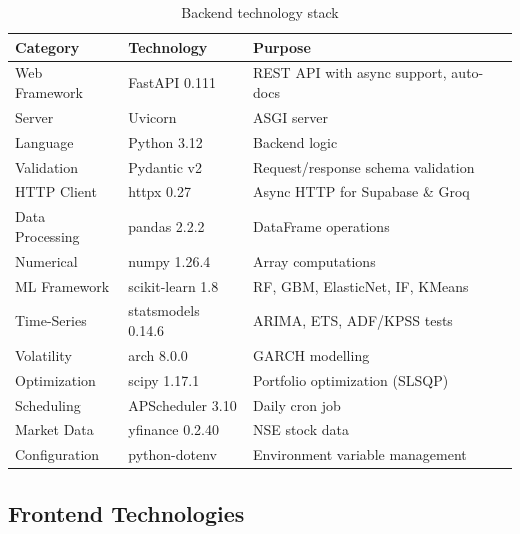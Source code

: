 \documentclass[12pt, a4paper, oneside]{report}
\begin{document}
\begin{table}[H]
\centering
\caption{Backend technology stack}
\label{tab:backend_stack}
\begin{tabularx}{\textwidth}{@{}l l X@{}}
\toprule
\textbf{Category} & \textbf{Technology} & \textbf{Purpose} \\
\midrule
Web Framework & FastAPI 0.111 & REST API with async support, auto-docs \\
Server & Uvicorn & ASGI server \\
Language & Python 3.12 & Backend logic \\
Validation & Pydantic v2 & Request/response schema validation \\
HTTP Client & httpx 0.27 & Async HTTP for Supabase \& Groq \\
Data Processing & pandas 2.2.2 & DataFrame operations \\
Numerical & numpy 1.26.4 & Array computations \\
ML Framework & scikit-learn 1.8 & RF, GBM, ElasticNet, IF, KMeans \\
Time-Series & statsmodels 0.14.6 & ARIMA, ETS, ADF/KPSS tests \\
Volatility & arch 8.0.0 & GARCH modelling \\
Optimization & scipy 1.17.1 & Portfolio optimization (SLSQP) \\
Scheduling & APScheduler 3.10 & Daily cron job \\
Market Data & yfinance 0.2.40 & NSE stock data \\
Configuration & python-dotenv & Environment variable management \\
\bottomrule
\end{tabularx}
\end{table}

\subsection{Frontend Technologies}
\end{document}
